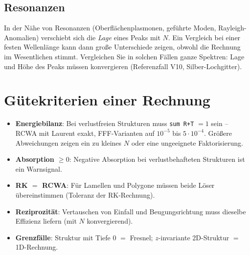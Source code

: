 \subsection{Resonanzen}
In der Nähe von Resonanzen (Oberflächenplasmonen, geführte Moden, Rayleigh-Anomalien) verschiebt sich die
\emph{Lage} eines Peaks mit $N$. Ein Vergleich bei einer festen Wellenlänge kann dann große Unterschiede zeigen,
obwohl die Rechnung im Wesentlichen stimmt. Vergleichen Sie in solchen Fällen ganze Spektren: Lage und Höhe des
Peaks müssen konvergieren (Referenzfall V10, Silber-Lochgitter).

\section{Gütekriterien einer Rechnung}\label{sec:guete}
%
\begin{itemize}
  \item \textbf{Energiebilanz}: Bei verlustfreien Strukturen muss \texttt{sum R+T} $=1$ sein -- RCWA mit Laurent
        exakt, FFF-Varianten auf $10^{-5}$ bis $5\cdot10^{-4}$. Größere Abweichungen zeigen ein zu kleines $N$ oder eine
        ungeeignete Faktorisierung.
  \item \textbf{Absorption $\ge0$}: Negative Absorption bei verlustbehafteten Strukturen ist ein Warnsignal.
  \item \textbf{RK $=$ RCWA}: Für Lamellen und Polygone müssen beide Löser übereinstimmen (Toleranz der RK-Rechnung).
  \item \textbf{Reziprozität}: Vertauschen von Einfall und Beugungsrichtung muss dieselbe Effizienz liefern (mit $N$
        konvergierend).
  \item \textbf{Grenzfälle}: Struktur mit Tiefe 0 $=$ Fresnel; $z$-invariante 2D-Struktur $=$ 1D-Rechnung.
\end{itemize}

